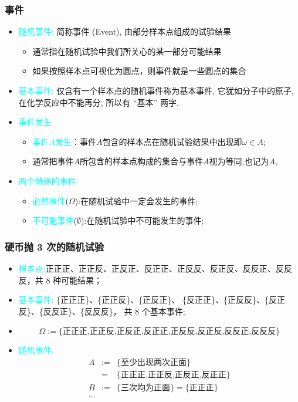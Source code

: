 \begin{frame}
  \frametitle{事件}
  \begin{itemize}[<+-|alert@+>]

  \item \textcolor{cyan}{随机事件:} 简称事件 ({\rm Event}), 由部分样本点组成的试验结果
  \begin{itemize}[<+-|alert@+>]
  	\item 通常指在随机试验中我们所关心的某一部分可能结果
  	\item  如果按照样本点可视化为圆点，则事件就是一些圆点的集合
	\end{itemize}
  \item \textcolor{cyan}{基本事件:} 仅含有一个样本点的随机事件称为基本事件, 它犹如分子中的原子, 在化学反应中不能再分, 所以有 ``基本'' 两字.
  \item \textcolor{cyan}{事件发生}
    \begin{itemize}[<+-|alert@+>]
    \item \textcolor{cyan}{事件$A$发生}：事件$A$包含的样本点在随机试验结果中出现即$\omega\in A$;
    \item 通常把事件$A$所包含的样本点构成的集合与事件$A$视为等同,也记为$A$,
    \end{itemize}
  \item \textcolor{cyan}{两个特殊的事件:}
    \begin{itemize}[<+-|alert@+>]
    \item \textcolor{cyan}{必然事件}($\Omega$):在随机试验中一定会发生的事件;
    \item \textcolor{cyan}{不可能事件}($\emptyset$):在随机试验中不可能发生的事件;
    \end{itemize}
  \end{itemize}
\end{frame}
\begin{frame}
  \frametitle{硬币抛 3 次的随机试验}
  \begin{itemize}[<+-|alert@+>]
  \item \textcolor{cyan}{样本点:}正正正、正正反、正反正、反正正、正反反、反正反、反反正、反反反，共 8 种可能结果；
  \item \textcolor{cyan}{基本事件:} \{正正正\}、\{正正反\}、\{正反正\}、 \{反正正\}、\{正反反\}、\{反正反\}、\{反反正\}、\{反反反\}， 共 8 个基本事件;
  \item {}
   {\small\[\Omega:=\{\mbox{正正正,正正反,正反正,反正正,正反反,反正反,反反正,反反反}\}\]}
  \item \textcolor{cyan}{随机事件:}
    \begin{eqnarray*}
      A&:=&\{\mbox{至少出现两次正面}\}\\
       &=&\{\mbox{正正正,正正反,正反正,反正正}\} \\
      B&:=&\{\mbox{三次均为正面}\}=\{\mbox{正正正}\}\\
      \cdots
    \end{eqnarray*}
  \end{itemize}
\end{frame}


